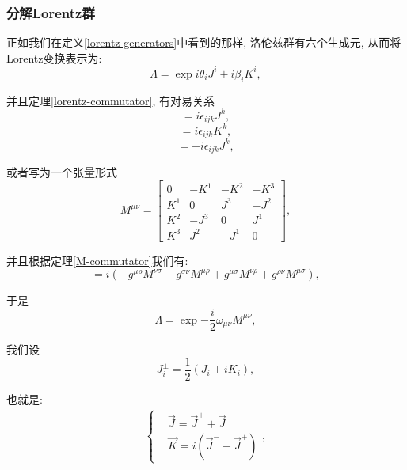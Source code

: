 \subsubsection{分解Lorentz群}
正如我们在定义\ref{lorentz-generators}中看到的那样, 洛伦兹群有六个生成元, 从而将Lorentz变换表示为:
\begin{equation}
    \Lambda=\exp{i\theta_i J^i+i\beta_i K^i},
\end{equation}

并且定理\ref{lorentz-commutator}, 有对易关系
\begin{equation}
    [J_i, J_j]=i\epsilon_{ijk}J^k,
\end{equation}
\begin{equation}
    [J_i, K_j]=i\epsilon_{ijk}K^k,
\end{equation}
\begin{equation}
    [K_i, K_j]=-i\epsilon_{ijk}J^k,
\end{equation}

或者写为一个张量形式
\begin{equation}
    M^{\mu\nu}=\begin{bmatrix}
        0 & -K^1 & -K^2 & -K^3\\
        K^1 & 0 & J^3 & -J^2\\
        K^2 & -J^3 & 0 & J^1\\
        K^3 & J^2 & -J^1 & 0
    \end{bmatrix},
\end{equation}

并且根据定理\ref{M-commutator}我们有:
\begin{equation}
    [M^{\mu\nu}, M^{\rho\sigma}]=i(-g^{\mu\rho}M^{\nu\sigma}-g^{\sigma\nu}M^{\mu\rho}+g^{\mu\sigma}M^{\nu\rho}+g^{\rho\nu}M^{\mu\sigma}),
\end{equation}

于是
\begin{equation}
    \Lambda=\exp{-\frac i2\omega_{\mu\nu}M^{\mu\nu}},
\end{equation}

我们设
\begin{equation}
    J_i^{\pm}=\frac12(J_i\pm iK_i),
\end{equation}

也就是:
\begin{align}
    \begin{cases}
        & \vec J=\vec J^++\vec J^-\\
        & \vec K=i(\vec J^--\vec J^+)
    \end{cases},
\end{align}

